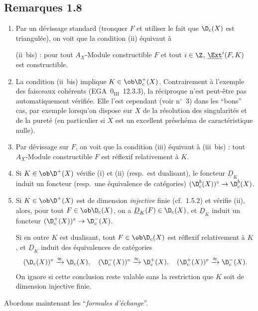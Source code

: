 \subsection*{Remarques 1.8}
\begin{enumerate}[label=\alph*)]
\item Par un dévissage standard (tronquer $F$ et utiliser le fait que $\D_c(X)$ est triangulée), on voit que la condition (ii) équivaut à

(ii~bis) : pour tout $A_X$-Module constructible $F$ et tout $i \in \Z$, $\underline{\Ext}^i(F,K)$ est constructible.

\item La condition (ii~bis) implique $K \in \ob \D_c^{+}(X)$. Contrairement à l'exemple des faisceaux cohérents (EGA~$0_{\mathrm{III}}$~12.3.3), la réciproque n'est peut-être pas automatiquement vérifiée. Elle l'est cependant (voir n${}^{\circ}$~3) dans les ``bons'' cas, par exemple lorsqu'on dispose sur $X$ de la résolution des singularités et de la
pureté (en particulier si $X$ est un excellent préschéma de caractéristique nulle).

\item Par dévissage sur $F$, on voit que la condition (iii) équivaut à (iii~bis) : tout $A_X$-Module constructible $F$ est réflexif relativement à $K$.

\item Si $K \in \ob \D^{+}(X)$ vérifie (i) et (ii) (resp.~est dualisant), le foncteur $\underline{D}_K$ induit un foncteur (resp.~une équivalence de catégories) $(\D_c^{b}(X))^{\circ} \to \D_c^{b}(X)$.

\item Si $K \in \ob \D^{+}(X)$ est de dimension \emph{injective} finie (cf.~1.5.2) et vérifie (ii), alors, pour tout $F \in \ob \D_c(X)$, on a $\underline{D}_K(F) \in \D_c(X)$, et $\underline{D}_K$ induit un foncteur $(\D_c^{+}(X))^{\circ} \to \D_c^{-}(X)$.

Si en outre $K$ est dualisant, tout $F \in \ob \D_c(X)$ est réflexif relativement à $K$, et $\underline{D}_K$ induit des équivalences de catégories
\[
(\D_c(X))^{\circ} \xrightarrow{\approx} \D_c(X), \quad (\D_c^{-}(X))^{\circ} \xrightarrow{\approx} \D_c^{+}(X), \quad (\D_c^{+}(X))^{\circ} \xrightarrow{\approx} \D_c^{-}(X).
\]
On ignore si cette conclusion reste valable sans la restriction que $K$ soit de dimension injective finie.
\end{enumerate}

Abordons maintenant les ``\emph{formules d'échange}''.

